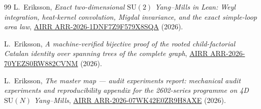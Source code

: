 \documentclass[11pt]{article}
\theoremstyle{definition}
\newcommand{\SU}{\mathrm{SU}}
\begin{document}
\begin{thebibliography}{99}
L.~Eriksson,
\emph{Exact two-dimensional $\SU(2)$ Yang--Mills in Lean: Weyl
integration, heat-kernel convolution, Migdal invariance, and the exact
simple-loop area law},
\href{https://airr.science/papers/ARR-2026-1DNF7Z9F579X8SQA/}{AIRR ARR-2026-1DNF7Z9F579X8SQA} (2026).

L.~Eriksson,
\emph{A machine-verified bijective proof of the rooted child-factorial
Catalan identity over spanning trees of the complete graph},
\href{https://airr.science/papers/ARR-2026-70YEZS0RW882CVNM/}{AIRR ARR-2026-70YEZS0RW882CVNM} (2026).

L.~Eriksson,
\emph{The master map --- audit experiments report: mechanical audit
experiments and reproducibility appendix for the 2602-series programme
on 4D $\SU(N)$ Yang--Mills},
\href{https://airr.science/papers/ARR-2026-07WK42E0ZR9H8AXE/}{AIRR ARR-2026-07WK42E0ZR9H8AXE} (2026).

\end{thebibliography}
\end{document}
